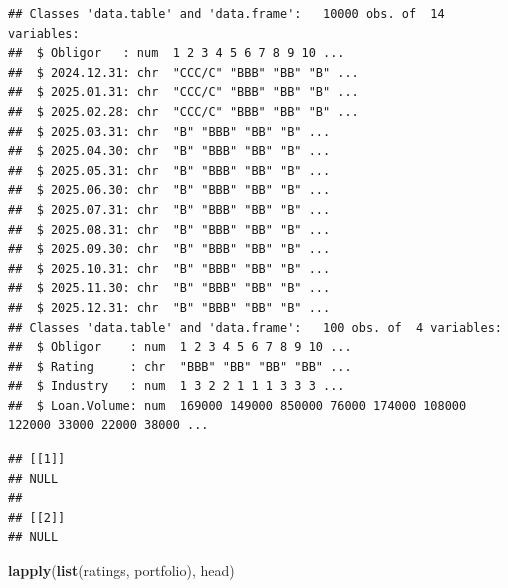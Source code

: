 \documentclass[
  11pt,
]{article}
\newenvironment{Shaded}{\begin{snugshade}}{\end{snugshade}}
\newcommand{\FunctionTok}[1]{\textcolor[rgb]{0.13,0.29,0.53}{\textbf{#1}}}
\newcommand{\NormalTok}[1]{#1}
\begin{document}
\begin{verbatim}
## Classes 'data.table' and 'data.frame':   10000 obs. of  14 variables:
##  $ Obligor   : num  1 2 3 4 5 6 7 8 9 10 ...
##  $ 2024.12.31: chr  "CCC/C" "BBB" "BB" "B" ...
##  $ 2025.01.31: chr  "CCC/C" "BBB" "BB" "B" ...
##  $ 2025.02.28: chr  "CCC/C" "BBB" "BB" "B" ...
##  $ 2025.03.31: chr  "B" "BBB" "BB" "B" ...
##  $ 2025.04.30: chr  "B" "BBB" "BB" "B" ...
##  $ 2025.05.31: chr  "B" "BBB" "BB" "B" ...
##  $ 2025.06.30: chr  "B" "BBB" "BB" "B" ...
##  $ 2025.07.31: chr  "B" "BBB" "BB" "B" ...
##  $ 2025.08.31: chr  "B" "BBB" "BB" "B" ...
##  $ 2025.09.30: chr  "B" "BBB" "BB" "B" ...
##  $ 2025.10.31: chr  "B" "BBB" "BB" "B" ...
##  $ 2025.11.30: chr  "B" "BBB" "BB" "B" ...
##  $ 2025.12.31: chr  "B" "BBB" "BB" "B" ...
## Classes 'data.table' and 'data.frame':   100 obs. of  4 variables:
##  $ Obligor    : num  1 2 3 4 5 6 7 8 9 10 ...
##  $ Rating     : chr  "BBB" "BB" "BB" "BB" ...
##  $ Industry   : num  1 3 2 2 1 1 1 3 3 3 ...
##  $ Loan.Volume: num  169000 149000 850000 76000 174000 108000 122000 33000 22000 38000 ...
\end{verbatim}

\begin{verbatim}
## [[1]]
## NULL
## 
## [[2]]
## NULL
\end{verbatim}

\begin{Shaded}
\begin{Highlighting}[]
\FunctionTok{lapply}\NormalTok{(}\FunctionTok{list}\NormalTok{(ratings, portfolio), head)}
\end{Highlighting}
\end{Shaded}
\end{document}

